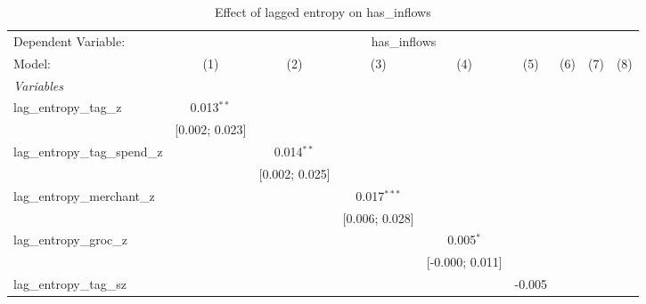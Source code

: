 
\begin{table}[htbp]
   \centering
   \tiny
   \begin{threeparttable}[b]
      \caption{\label{tab:reg_has_inflows_lagged} Effect of lagged entropy on has\_inflows}
      \begin{tabular}{lcccccccc}
         \tabularnewline \midrule \midrule
         Dependent Variable: & \multicolumn{8}{c}{has\_inflows}\\
         Model:                           & (1)            & (2)            & (3)            & (4)             & (5)             & (6)              & (7)              & (8)\\  
         \midrule
         \emph{Variables}\\
         lag\_entropy\_tag\_z             & 0.013$^{**}$   &                &                &                 &                 &                  &                  &   \\   
                                          & [0.002; 0.023] &                &                &                 &                 &                  &                  &   \\   
         lag\_entropy\_tag\_spend\_z      &                & 0.014$^{**}$   &                &                 &                 &                  &                  &   \\   
                                          &                & [0.002; 0.025] &                &                 &                 &                  &                  &   \\   
         lag\_entropy\_merchant\_z        &                &                & 0.017$^{***}$  &                 &                 &                  &                  &   \\   
                                          &                &                & [0.006; 0.028] &                 &                 &                  &                  &   \\   
         lag\_entropy\_groc\_z            &                &                &                & 0.005$^{*}$     &                 &                  &                  &   \\   
                                          &                &                &                & [-0.000; 0.011] &                 &                  &                  &   \\   
         lag\_entropy\_tag\_sz            &                &                &                &                 & -0.005          &                  &                  &   \\   

\end{tabular}
\end{threeparttable}
\end{table}
